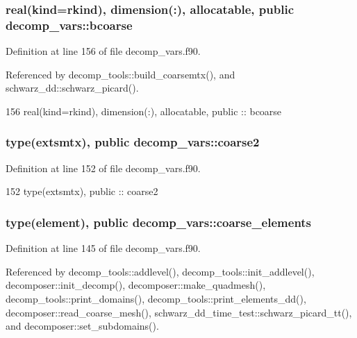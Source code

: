 \subsubsection[{bcoarse}]{\setlength{\rightskip}{0pt plus 5cm}real(kind=rkind), dimension(\+:), allocatable, public decomp\+\_\+vars\+::bcoarse}\label{namespacedecomp__vars_affd9d31213fdce426b976b72de5f73df}


Definition at line 156 of file decomp\+\_\+vars.\+f90.



Referenced by decomp\+\_\+tools\+::build\+\_\+coarsemtx(), and schwarz\+\_\+dd\+::schwarz\+\_\+picard().


\begin{DoxyCode}
156   \textcolor{keywordtype}{real(kind=rkind)}, \textcolor{keywordtype}{dimension(:)}, \textcolor{keywordtype}{allocatable}, \textcolor{keywordtype}{public} :: bcoarse
\end{DoxyCode}
\subsubsection[{coarse2}]{\setlength{\rightskip}{0pt plus 5cm}type({\bf extsmtx}), public decomp\+\_\+vars\+::coarse2}\label{namespacedecomp__vars_aaad4631c6f6021c5ce8f06996b77f14d}


Definition at line 152 of file decomp\+\_\+vars.\+f90.


\begin{DoxyCode}
152   \textcolor{keywordtype}{type}(extsmtx), \textcolor{keywordtype}{public} :: coarse2
\end{DoxyCode}
\subsubsection[{coarse\+\_\+elements}]{\setlength{\rightskip}{0pt plus 5cm}type({\bf element}), public decomp\+\_\+vars\+::coarse\+\_\+elements}\label{namespacedecomp__vars_a53341b6c5e98f0fe3828cb220a4ff2b6}


Definition at line 145 of file decomp\+\_\+vars.\+f90.



Referenced by decomp\+\_\+tools\+::addlevel(), decomp\+\_\+tools\+::init\+\_\+addlevel(), decomposer\+::init\+\_\+decomp(), decomposer\+::make\+\_\+quadmesh(), decomp\+\_\+tools\+::print\+\_\+domains(), decomp\+\_\+tools\+::print\+\_\+elements\+\_\+dd(), decomposer\+::read\+\_\+coarse\+\_\+mesh(), schwarz\+\_\+dd\+\_\+time\+\_\+test\+::schwarz\+\_\+picard\+\_\+tt(), and decomposer\+::set\+\_\+subdomains().


